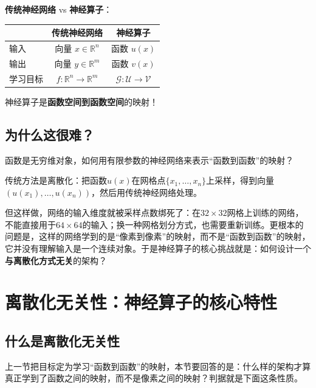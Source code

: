 \begin{insightbox}
\textbf{传统神经网络} vs \textbf{神经算子}：

\begin{center}
\begin{tabular}{l|cc}
\toprule
& \textbf{传统神经网络} & \textbf{神经算子} \\
\midrule
输入 & 向量 $x \in \mathbb{R}^n$ & 函数 $u(x)$ \\
输出 & 向量 $y \in \mathbb{R}^m$ & 函数 $v(x)$ \\
学习目标 & $f: \mathbb{R}^n \to \mathbb{R}^m$ & $\mathcal{G}: \mathcal{U} \to \mathcal{V}$ \\
\bottomrule
\end{tabular}
\end{center}

神经算子是\textbf{函数空间到函数空间}的映射！
\end{insightbox}

\subsection{为什么这很难？}

函数是无穷维对象，如何用有限参数的神经网络来表示“函数到函数”的映射？

传统方法是离散化：把函数$u(x)$在网格点$\{x_1, \ldots, x_n\}$上采样，得到向量$(u(x_1), \ldots, u(x_n))$，然后用传统神经网络处理。

但这样做，网络的输入维度就被采样点数绑死了：在$32 \times 32$网格上训练的网络，不能直接用于$64 \times 64$的输入；换一种网格划分方式，也需要重新训练。更根本的问题是，这样的网络学到的是“像素到像素”的映射，而不是“函数到函数”的映射，它并没有理解输入是一个连续对象。于是神经算子的核心挑战就是：如何设计一个\textbf{与离散化方式无关}的架构？

\section{离散化无关性：神经算子的核心特性}

\subsection{什么是离散化无关性}

上一节把目标定为学习“函数到函数”的映射，本节要回答的是：什么样的架构才算真正学到了函数之间的映射，而不是像素之间的映射？判据就是下面这条性质。

